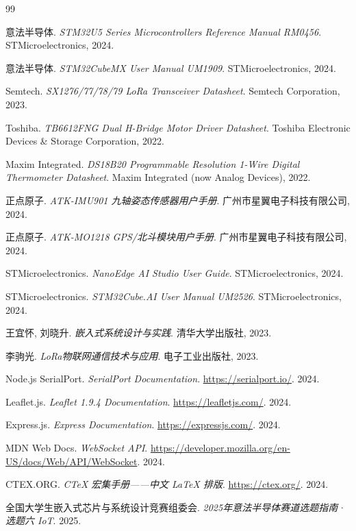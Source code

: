 \documentclass[12pt,a4paper]{ctexart}
\begin{document}
\begin{thebibliography}{99}

意法半导体. \textit{STM32U5 Series Microcontrollers Reference Manual RM0456}. STMicroelectronics, 2024.

意法半导体. \textit{STM32CubeMX User Manual UM1909}. STMicroelectronics, 2024.

Semtech. \textit{SX1276/77/78/79 LoRa Transceiver Datasheet}. Semtech Corporation, 2023.

Toshiba. \textit{TB6612FNG Dual H-Bridge Motor Driver Datasheet}. Toshiba Electronic Devices \& Storage Corporation, 2022.

Maxim Integrated. \textit{DS18B20 Programmable Resolution 1-Wire Digital Thermometer Datasheet}. Maxim Integrated (now Analog Devices), 2022.

正点原子. \textit{ATK-IMU901 九轴姿态传感器用户手册}. 广州市星翼电子科技有限公司, 2024.

正点原子. \textit{ATK-MO1218 GPS/北斗模块用户手册}. 广州市星翼电子科技有限公司, 2024.

STMicroelectronics. \textit{NanoEdge AI Studio User Guide}. STMicroelectronics, 2024.

STMicroelectronics. \textit{STM32Cube.AI User Manual UM2526}. STMicroelectronics, 2024.

王宜怀, 刘晓升. \textit{嵌入式系统设计与实践}. 清华大学出版社, 2023.

李驹光. \textit{LoRa物联网通信技术与应用}. 电子工业出版社, 2023.

Node.js SerialPort. \textit{SerialPort Documentation}. \url{https://serialport.io/}. 2024.

Leaflet.js. \textit{Leaflet 1.9.4 Documentation}. \url{https://leafletjs.com/}. 2024.

Express.js. \textit{Express Documentation}. \url{https://expressjs.com/}. 2024.

MDN Web Docs. \textit{WebSocket API}. \url{https://developer.mozilla.org/en-US/docs/Web/API/WebSocket}. 2024.

CTEX.ORG. \textit{CTeX 宏集手册——中文 \LaTeX{} 排版}. \url{https://ctex.org/}. 2024.

全国大学生嵌入式芯片与系统设计竞赛组委会. \textit{2025年意法半导体赛道选题指南·选题六 IoT}. 2025.

\end{thebibliography}
\end{document}
